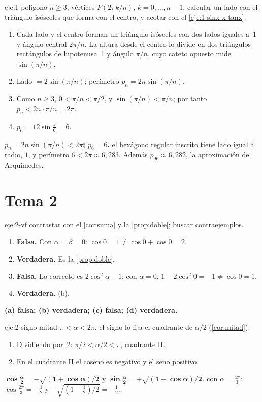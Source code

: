 \begin{solucion}{eje:1-poligono}
\datos $n\ge3$; vértices $P(2\pi k/n)$, $k=0,\dots,n-1$.
\planteamiento calcular un lado con el triángulo isósceles que forma con el centro, y acotar con el \cref{eje:1-sinx-x-tanx}.
\pasos
\begin{enumerate}[label=\arabic*.]
  \item Cada lado y el centro forman un triángulo isósceles con dos lados iguales a~1 y ángulo central $2\pi/n$. La altura desde el centro lo divide en dos triángulos rectángulos de hipotenusa~1 y ángulo $\pi/n$, cuyo cateto opuesto mide $\sin(\pi/n)$.
  \item Lado $=2\sin(\pi/n)$; perímetro $p_n=2n\sin(\pi/n)$.
  \item Como $n\ge3$, $0<\pi/n<\pi/2$, y $\sin(\pi/n)<\pi/n$; por tanto $p_n<2n\cdot\pi/n=2\pi$.
  \item $p_6=12\sin\frac{\pi}{6}=6$.
\end{enumerate}
\resultado \textbf{$p_n=2n\sin(\pi/n)<2\pi$; $p_6=6$.}
\comprobacion el hexágono regular inscrito tiene lado igual al radio, $1$, y perímetro $6<2\pi\approx6{,}283$. Además $p_{96}\approx6{,}282$, la aproximación de Arquímedes.
\end{solucion}

\section{Tema 2}

\begin{solucion}{eje:2-vf}
\planteamiento contrastar con el \cref{cor:suma} y la \cref{prop:doble}; buscar contraejemplos.
\pasos
\begin{enumerate}[label=(\alph*)]
  \item \textbf{Falsa.} Con $\alpha=\beta=0$: $\cos0=1\ne\cos0+\cos0=2$.
  \item \textbf{Verdadera.} Es la \cref{prop:doble}.
  \item \textbf{Falsa.} Lo correcto es $2\cos^{2}\alpha-1$; con $\alpha=0$, $1-2\cos^{2}0=-1\ne\cos0=1$.
  \item \textbf{Verdadera.} (b).
\end{enumerate}
\resultado \textbf{(a) falsa; (b) verdadera; (c) falsa; (d) verdadera.}
\end{solucion}

\begin{solucion}{eje:2-signo-mitad}
\datos $\pi<\alpha<2\pi$.
\planteamiento el signo lo fija el cuadrante de $\alpha/2$ (\cref{cor:mitad}).
\pasos
\begin{enumerate}[label=\arabic*.]
  \item Dividiendo por~2: $\pi/2<\alpha/2<\pi$, cuadrante II.
  \item En el cuadrante II el coseno es negativo y el seno positivo.
\end{enumerate}
\resultado $\mathbf{\cos\frac{\alpha}{2}=-\sqrt{(1+\cos\alpha)/2}}$ y $\mathbf{\sin\frac{\alpha}{2}=+\sqrt{(1-\cos\alpha)/2}}$.
\comprobacion con $\alpha=\frac{4\pi}{3}$: $\cos\frac{2\pi}{3}=-\frac12$ y $-\sqrt{(1-\frac12)/2}=-\frac12$.
\end{solucion}

